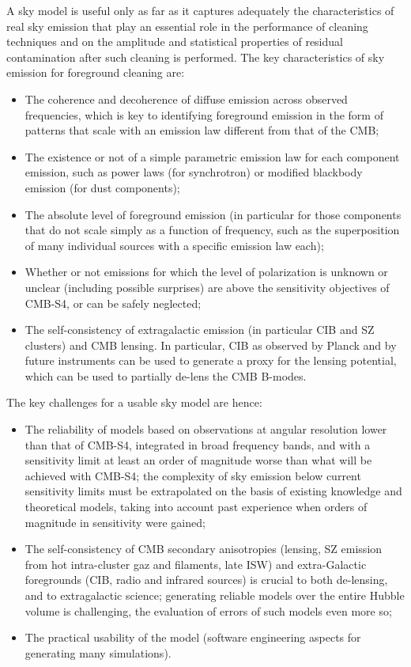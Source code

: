 A sky model is useful only as far as it captures adequately the characteristics of real sky emission that play an essential role in the performance of cleaning techniques and on the amplitude and statistical properties of residual contamination after such cleaning is performed. The key characteristics of sky emission for foreground cleaning are:
\begin{itemize}
\item The coherence and decoherence of diffuse emission across observed frequencies, which is key to identifying foreground emission in the form of patterns that scale with an emission law different from that of the CMB;
\item The existence or not of a simple parametric emission law for each component emission, such as power laws (for synchrotron) or modified blackbody emission (for dust components);
\item The absolute level of foreground emission (in particular for those components that do not scale simply as a function of frequency, such as the superposition of many individual sources with a specific emission law each);
\item Whether or not emissions for which the level of polarization is unknown or unclear (including possible surprises) are above the sensitivity objectives of CMB-S4, or can be safely neglected;
\item The self-consistency of extragalactic emission (in particular CIB and SZ clusters) and CMB lensing. In particular, CIB as observed by Planck and by future instruments can be used to generate a proxy for the lensing potential, which can be used to partially de-lens the CMB B-modes.
\end{itemize} 


The key challenges for a usable sky model are hence:
\begin{itemize} 
\item The reliability of models based on observations at angular resolution lower than that of CMB-S4, integrated in broad frequency bands, and with a sensitivity limit at least an order of magnitude worse than what will be achieved with CMB-S4; the complexity of sky emission below current sensitivity limits must be extrapolated on the basis of existing knowledge and theoretical models, taking into account past experience when orders of magnitude in sensitivity were gained;
\item The self-consistency of CMB secondary anisotropies (lensing, SZ emission from hot intra-cluster gaz and filaments, late ISW) and extra-Galactic foregrounds (CIB, radio and infrared sources) is crucial to both de-lensing, and to extragalactic science; generating reliable models over the entire Hubble volume is challenging, the evaluation of errors of such models even more so;
\item The practical usability of the model (software engineering aspects for generating many simulations).
\end{itemize} 


